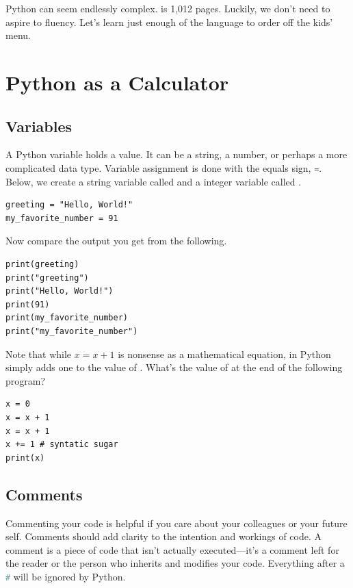 \documentclass{article}
\begin{document}
Python can seem endlessly complex.  is 1,012 pages. Luckily, we don't need to aspire to fluency. Let's learn just enough of the language to order off the kids' menu. 


\section{Python as a Calculator}

\subsection{Variables}

A Python variable holds a value. It can be a string, a number, or perhaps a more complicated data type. Variable assignment is done with the equals sign, \lstinline[language = Python]{=}. Below, we create a string variable called  and a integer variable called . 

\smallskip

\begin{lstlisting}
greeting = "Hello, World!"
my_favorite_number = 91
\end{lstlisting}

\smallskip
\noindent Now compare the output you get from the following.
\begin{lstlisting}
print(greeting)
print("greeting")
print("Hello, World!")
print(91)
print(my_favorite_number)
print("my_favorite_number")
\end{lstlisting}

\noindent Note that while $x = x+1$ is nonsense as a mathematical equation, in Python  simply adds one to the value of . What's the value of  at the end of the following program? 

\begin{lstlisting}
x = 0
x = x + 1 
x = x + 1
x += 1 # syntatic sugar
print(x)
\end{lstlisting}

\subsection{Comments}
Commenting your code is helpful if you care about your colleagues or your future self. Comments should add clarity to the intention and workings of code. A comment is a piece of code that isn't actually executed---it's a comment left for the reader or the person who inherits and modifies your code.
Everything after a \lstinline[language = Python]{#} will be ignored by Python.
\end{document}
